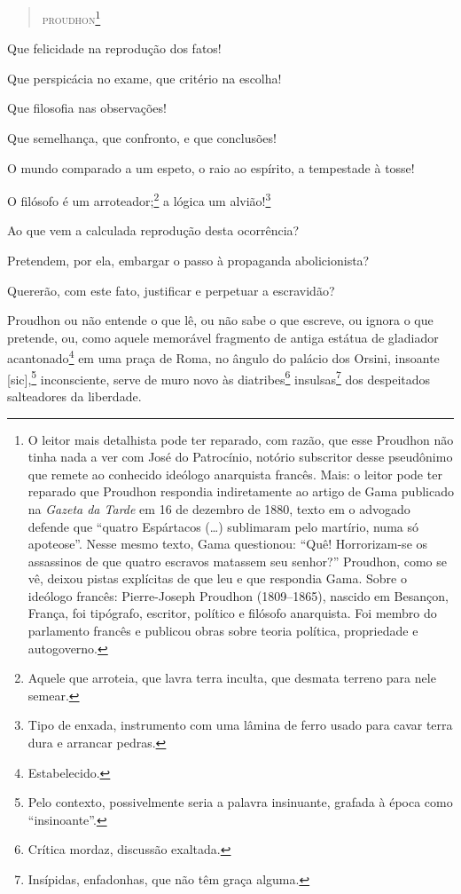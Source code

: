 \begin{quote}
\hfill\textsc{proudhon}\footnote{O leitor mais detalhista pode ter reparado, com razão, que esse Proudhon não tinha nada a ver com José do
  Patrocínio, notório subscritor desse pseudônimo que remete ao
  conhecido ideólogo anarquista francês. Mais: o leitor pode ter
  reparado que Proudhon respondia indiretamente ao artigo de Gama
  publicado na \emph{Gazeta da Tarde} em 16 de dezembro de 1880, texto em o advogado
  defende que ``quatro Espártacos (\ldots{}) sublimaram pelo martírio, numa só
  apoteose''. Nesse mesmo texto, Gama questionou: ``Quê! Horrorizam-se os
  assassinos de que quatro escravos matassem seu senhor?''
  Proudhon, como se vê, deixou pistas explícitas de que leu e que
  respondia Gama. Sobre o ideólogo francês: Pierre-Joseph Proudhon \label{proudhon}
  (1809--1865), nascido em Besançon, França, foi tipógrafo, escritor,
  político e filósofo anarquista. Foi membro do parlamento francês e
  publicou obras sobre teoria política, propriedade e autogoverno.}
\end{quote}

\asterisc

Que felicidade na reprodução dos fatos!

Que perspicácia no exame, que critério na escolha!

Que filosofia nas observações!

Que semelhança, que confronto, e que conclusões!

O mundo comparado a um espeto, o raio ao espírito, a tempestade à tosse!

O filósofo é um arroteador;\footnote{Aquele que arroteia, que lavra
  terra inculta, que desmata terreno para nele semear.} a lógica um
alvião!\footnote{Tipo de enxada, instrumento com uma lâmina de ferro
  usado para cavar terra dura e arrancar pedras.}

Ao que vem a calculada reprodução desta ocorrência?

Pretendem, por ela, embargar o passo à propaganda abolicionista?

Quererão, com este fato, justificar e perpetuar a escravidão?

Proudhon ou não entende o que lê, ou não sabe o que escreve, ou
ignora o que pretende, ou, como aquele memorável fragmento de antiga
estátua de gladiador acantonado\footnote{Estabelecido.} em uma praça
de Roma, no ângulo do palácio dos Orsini, insoante {[}sic{]},\footnote{
  Pelo contexto, possivelmente seria a palavra insinuante, grafada à
  época como ``insinoante''.} inconsciente, serve de muro novo às
diatribes\footnote{Crítica mordaz, discussão exaltada.}
insulsas\footnote{Insípidas, enfadonhas, que não têm graça alguma.}
dos despeitados salteadores da liberdade.

